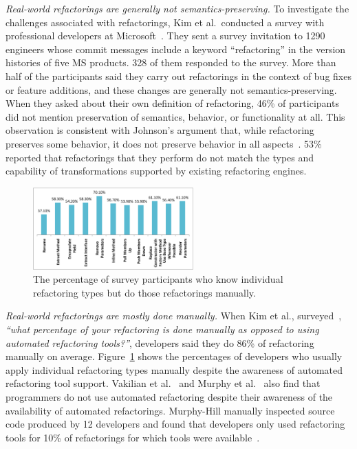 \documentclass[runningheads,a4paper]{llncs}
\begin{document}
{\it Real-world refactorings are generally not semantics-preserving.} 
To investigate the challenges associated with refactorings, Kim et al.~conducted a survey with professional developers at Microsoft~\cite{Kim2012:FSR}. They sent a survey invitation to 1290 engineers whose commit messages include a keyword ``refactoring'' in the version histories of five MS products. 328 of them responded to the survey. More than half of the participants said they carry out refactorings in the context of bug fixes or feature additions, and these changes are generally not semantics-preserving. When they asked about their own definition of refactoring, 46\% of participants did not mention preservation of semantics, behavior, or functionality at all. This observation is consistent with Johnson's argument that, while refactoring preserves some behavior, it does not preserve behavior in all aspects~\cite{Johnson2011}. 53\% reported that refactorings that they perform do not match the types and capability of transformations supported by existing refactoring engines. 

\begin{figure}[!htb]
\centering
    \includegraphics[width=0.55\textwidth]{images/manualRefactoring.pdf}
\caption{The percentage of survey participants who know individual refactoring types but do those refactorings manually.} 
\label{fig:manualRefactoring} 
\end{figure} 


{\it Real-world refactorings are mostly done manually.} 
When Kim et al., surveyed~\cite{Kim2012:FSR}, {\it ``what percentage of your refactoring is done manually as opposed to using automated refactoring tools?''}, developers said they do 86\% of refactoring manually on average. Figure~\ref{fig:manualRefactoring} shows the percentages of developers who usually apply individual refactoring types manually despite the awareness of automated refactoring tool support. Vakilian et al.~\cite{Vakilian:2012} and Murphy et al.~\cite{Murphy2006:JSD} also find that programmers do not use automated refactoring despite their awareness of the availability of automated refactorings. Murphy-Hill manually inspected source code produced by 12 developers and found that developers only used refactoring tools for 10\% of refactorings for which tools were available~\cite{Murphy-Hill2012:refactor}. 
\end{document}
